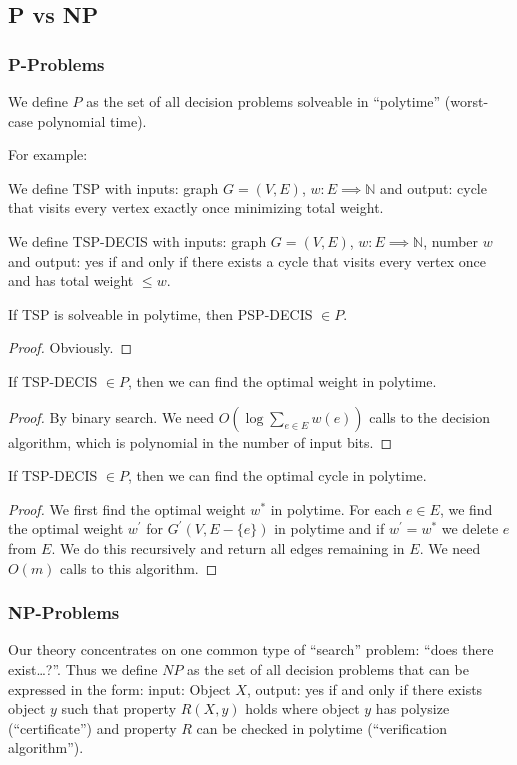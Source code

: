 \documentclass[12pt]{article}
\begin{document}

\subsection{P vs NP}
\subsubsection{P-Problems}
We define $P$ as the set of all decision problems solveable in ``polytime'' (worst-case polynomial time).

For example:
\begin{example}
We define TSP with inputs: graph $G = (V, E)$, $w : E \implies \mathbb{N}$ and output: cycle that visits every vertex exactly once minimizing total weight.

We define TSP-DECIS with inputs: graph $G = (V, E)$, $w : E \implies \mathbb{N}$, number $w$ and output: yes if and only if there exists a cycle that visits every vertex once and has total weight $\leq w$.

If TSP is solveable in polytime, then PSP-DECIS $\in P$.
\begin{proof}
Obviously.
\end{proof}

If TSP-DECIS $\in P$, then we can find the optimal weight in polytime.
\begin{proof}
By binary search. We need $O(\log\sum_{e\in E} w(e))$ calls to the decision algorithm, which is polynomial in the number of input bits.
\end{proof}

If TSP-DECIS $\in P$, then we can find the optimal cycle in polytime.
\begin{proof}
We first find the optimal weight $w^*$ in polytime. For each $e\in E$, we find the optimal weight $w^\prime$ for $G^\prime(V, E - \{e\})$ in polytime and if $w^\prime = w^*$ we delete $e$ from $E$. We do this recursively and return all edges remaining in $E$. We need $O(m)$ calls to this algorithm.
\end{proof}
\end{example}

\subsubsection{NP-Problems}
Our theory concentrates on one common type of ``search'' problem: ``does there exist\dots ?''. Thus we define $NP$ as the set of all decision problems that can be expressed in the form: input: Object $X$, output: yes if and only if there exists object $y$ such that property $R(X, y)$ holds where object $y$ has polysize (``certificate'') and property $R$ can be checked in polytime (``verification algorithm'').
\end{document}
